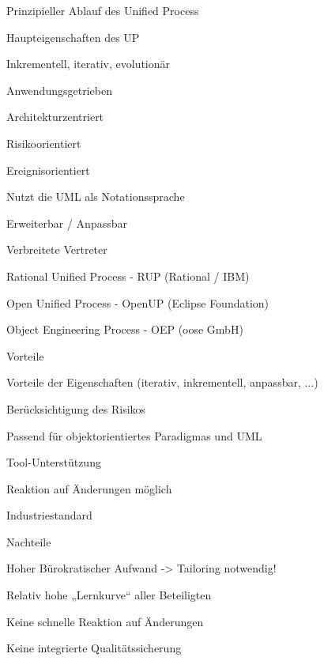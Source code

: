 \documentclass[a4paper]{article}
\begin{document}
\begin{multicols}{3}
  Prinzipieller Ablauf des Unified Process
  \begin{itemize*}
    \item Haupteigenschaften des UP
          \begin{itemize*}
            \item Inkrementell, iterativ, evolutionär
            \item Anwendungsgetrieben
            \item Architekturzentriert
            \item Risikoorientiert
            \item Ereignisorientiert
            \item Nutzt die UML als Notationssprache
            \item Erweiterbar / Anpassbar
          \end{itemize*}
    \item Verbreitete Vertreter
          \begin{itemize*}
            \item Rational Unified Process - RUP (Rational / IBM)
            \item Open Unified Process - OpenUP (Eclipse Foundation)
            \item Object Engineering Process - OEP (oose GmbH)
          \end{itemize*}
    \item Vorteile
          \begin{itemize*}
            \item Vorteile der Eigenschaften (iterativ, inkrementell, anpassbar, ...)
            \item Berücksichtigung des Risikos
            \item Passend für objektorientiertes Paradigmas und UML
            \item Tool-Unterstützung
            \item Reaktion auf Änderungen möglich
            \item Industriestandard
          \end{itemize*}
    \item Nachteile
          \begin{itemize*}
            \item Hoher Bürokratischer Aufwand -> Tailoring notwendig!
            \item Relativ hohe „Lernkurve“ aller Beteiligten
            \item Keine schnelle Reaktion auf Änderungen
            \item Keine integrierte Qualitätssicherung
          \end{itemize*}
  \end{itemize*}


\end{multicols}
\end{document}
